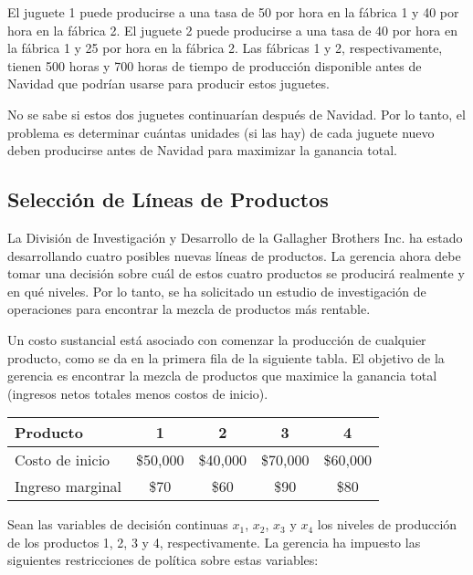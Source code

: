 \documentclass[12pt]{article}
\begin{document}
\vspace{0.5em}

El juguete 1 puede producirse a una tasa de 50 por hora en la fábrica 1 y 40 por hora en la fábrica 2. El juguete 2 puede producirse a una tasa de 40 por hora en la fábrica 1 y 25 por hora en la fábrica 2. Las fábricas 1 y 2, respectivamente, tienen 500 horas y 700 horas de tiempo de producción disponible antes de Navidad que podrían usarse para producir estos juguetes.

\vspace{0.5em}

No se sabe si estos dos juguetes continuarían después de Navidad. Por lo tanto, el problema es determinar cuántas unidades (si las hay) de cada juguete nuevo deben producirse antes de Navidad para maximizar la ganancia total.

\subsection{Selección de Líneas de Productos}
La División de Investigación y Desarrollo de la Gallagher Brothers Inc. ha estado desarrollando cuatro posibles nuevas líneas de productos. La gerencia ahora debe tomar una decisión sobre cuál de estos cuatro productos se producirá realmente y en qué niveles. Por lo tanto, se ha solicitado un estudio de investigación de operaciones para encontrar la mezcla de productos más rentable.

\vspace{0.5em}

Un costo sustancial está asociado con comenzar la producción de cualquier producto, como se da en la primera fila de la siguiente tabla. El objetivo de la gerencia es encontrar la mezcla de productos que maximice la ganancia total (ingresos netos totales menos costos de inicio).

\begin{table}[h]
\centering
\begin{tabular}{lcccc}
\toprule
\textbf{Producto} & 1 & 2 & 3 & 4 \\
\midrule
Costo de inicio & \$50,000 & \$40,000 & \$70,000 & \$60,000 \\
Ingreso marginal & \$70 & \$60 & \$90 & \$80 \\
\bottomrule
\end{tabular}
\end{table}

Sean las variables de decisión continuas $x_1$, $x_2$, $x_3$ y $x_4$ los niveles de producción de los productos 1, 2, 3 y 4, respectivamente. La gerencia ha impuesto las siguientes restricciones de política sobre estas variables:
\end{document}
